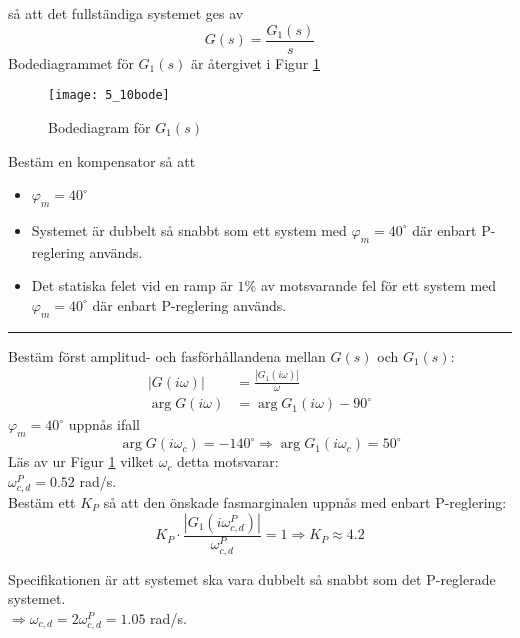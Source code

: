 \documentclass[12pt]{article}
\newcommand{\qline}{\hrule \vspace*{10pt}}
\begin{document}
så att det fullständiga systemet ges av 
\[G(s) = \frac{G_1(s)}{s}\]
Bodediagrammet för $G_1(s)$ är återgivet i Figur \ref{fig:5_10bode}
\begin{figure}[h!]
  \centering
  \texttt{[image: 5\_10bode]}
  \caption{Bodediagram för $G_1(s)$}
  \label{fig:5_10bode}
\end{figure}
\FloatBarrier

Bestäm en kompensator så att
\begin{itemize}
\item $\varphi_m = 40^{\circ}$
\item Systemet är dubbelt så snabbt som ett system med $\varphi_m = 40^{\circ}$ där enbart P-reglering används.
\item Det statiska felet vid en ramp är $1\%$ av motsvarande fel för ett system med $\varphi_m = 40^{\circ}$ där enbart P-reglering används.
\end{itemize}
\qline
Bestäm först amplitud- och fasförhållandena mellan $G(s)$ och $G_1(s)$:
\begin{align*}
  |G(i\omega)| &= \frac{|G_1(i\omega)|}{\omega} \\
  \arg{G(i\omega)} &= \arg{G_1(i\omega)} - 90^{\circ}
\end{align*}
$\varphi_m = 40^{\circ}$ uppnås ifall 
\[\arg{G(i\omega_c)} = -140 ^{\circ} \Rightarrow \arg{G_1(i\omega_c)} = 50 ^{\circ}\]
Läs av ur Figur \ref{fig:5_10bode} vilket $\omega_c$ detta motsvarar: \\
$\omega_{c,d}^P = 0.52$ rad/s. \\
Bestäm ett $K_P$ så att den önskade fasmarginalen uppnås med enbart P-reglering: \\
\[K_P\cdot \frac{|G_1(i\omega_{c,d}^P)|}{\omega_{c,d}^P} = 1 \Rightarrow K_P \approx 4.2\]

Specifikationen är att systemet ska vara dubbelt så snabbt som det P-reglerade systemet. \\
$\Rightarrow \omega_{c,d} = 2\omega_{c,d}^P = 1.05$ rad/s. \\
\end{document}
